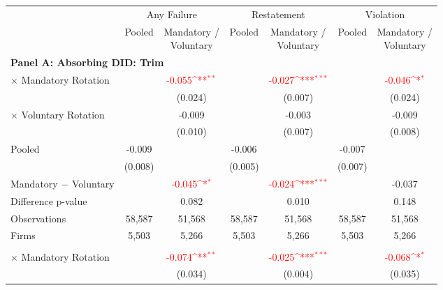 \documentclass[10pt]{article}
\newcommand{\sym}[1]{\textsuperscript{#1}}
\begin{document}
\begin{minipage}{19cm}\fontsize{10}{12}\selectfont\setlength{\tabcolsep}{4pt}\renewcommand{\arraystretch}{1.12}


\def\sym#1{\ifmmode^{#1}\else\(^{#1}\)\fi}
\centering
{}
\label{tab:absorbing-transition-big4-background-upgrade-no-auditfirm-fe}
\begin{threeparttable}

\begin{tabular}{l cc cc cc}
\toprule
 & \multicolumn{2}{c}{Any Failure} & \multicolumn{2}{c}{Restatement} & \multicolumn{2}{c}{Violation} \\
\cmidrule(lr){2-3}\cmidrule(lr){4-5}\cmidrule(lr){6-7}
 & Pooled & \shortstack{Mandatory /\\Voluntary} & Pooled & \shortstack{Mandatory /\\Voluntary} & Pooled & \shortstack{Mandatory /\\Voluntary} \\
\midrule
\multicolumn{7}{l}{\textbf{Panel A: Absorbing DID: Trim}} \\
$\times$ Mandatory Rotation &  & \textcolor{red}{-0.055\sym{**}} &  & \textcolor{red}{-0.027\sym{***}} &  & \textcolor{red}{-0.046\sym{*}} \\
 &  & (0.024) &  & (0.007) &  & (0.024) \\
$\times$ Voluntary Rotation &  & -0.009 &  & -0.003 &  & -0.009 \\
 &  & (0.010) &  & (0.007) &  & (0.008) \\
Pooled & -0.009 &  & -0.006 &  & -0.007 &  \\
 & (0.008) &  & (0.005) &  & (0.007) &  \\
Mandatory $-$ Voluntary &  & \textcolor{red}{-0.045\sym{*}} &  & \textcolor{red}{-0.024\sym{***}} &  & -0.037 \\
Difference p-value &  & 0.082 &  & 0.010 &  & 0.148 \\
Observations & 58,587 & 51,568 & 58,587 & 51,568 & 58,587 & 51,568 \\
Firms & 5,503 & 5,266 & 5,503 & 5,266 & 5,503 & 5,266 \\
\addlinespace
\multicolumn{7}{l}{\textbf{Panel B: Absorbing DID: Strict}} \\
$\times$ Mandatory Rotation &  & \textcolor{red}{-0.074\sym{**}} &  & \textcolor{red}{-0.025\sym{***}} &  & \textcolor{red}{-0.068\sym{*}} \\
 &  & (0.034) &  & (0.004) &  & (0.035) \\

\end{tabular}
\end{threeparttable}
\end{minipage}
\end{document}
